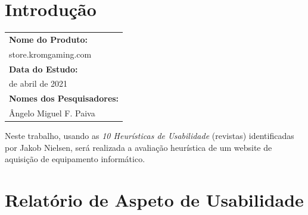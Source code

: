 \documentclass[11pt]{article}
\begin{document}
	
	
	\tableofcontents
	\pagebreak
	
	\large
	\section{Introdução}
	
	\normalsize
	\begin{center}
		\begin{tabularx}{\textwidth}{ |>{\raggedright\arraybackslash}X| }
			\hline
			\textbf{Nome do Produto:} \\ 
			store.kromgaming.com \\ \hline
			\textbf{Data do Estudo:} \\ 
			25 de abril de 2021 \\ \hline
			\textbf{Nomes dos Pesquisadores:} \\ 
			Ângelo Miguel F. Paiva \\ \hline   
		\end{tabularx}
	\end{center}

	Neste trabalho, usando as \textit{10 Heurísticas de Usabilidade} (revistas) identificadas por Jakob Nielsen, será realizada a avaliação heurística de um website de aquisição de equipamento informático.
	
	\large
	\section{Relatório de Aspeto de Usabilidade}
	
\end{document}
